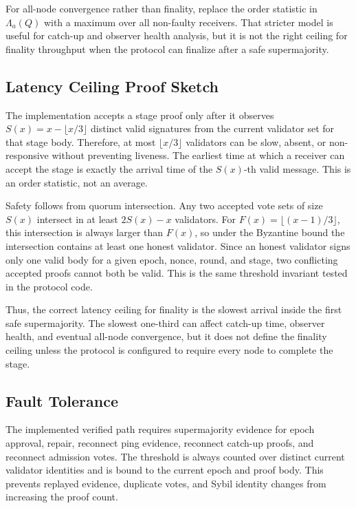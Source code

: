 For all-node convergence rather than finality, replace the order statistic in
\(\Lambda_a(Q)\) with a maximum over all non-faulty receivers. That stricter
model is useful for catch-up and observer health analysis, but it is not the
right ceiling for finality throughput when the protocol can finalize after a
safe supermajority.

\subsection{Latency Ceiling Proof Sketch}\label{proj:latency-proof}

The implementation accepts a stage proof only after it observes
\(S(x)=x-\lfloor x/3 \rfloor\) distinct valid signatures from the current
validator set for that stage body. Therefore, at most
\(\lfloor x/3 \rfloor\) validators can be slow, absent, or non-responsive
without preventing liveness. The earliest time at which a receiver can accept
the stage is exactly the arrival time of the \(S(x)\)-th valid message. This
is an order statistic, not an average.

Safety follows from quorum intersection. Any two accepted vote sets of size
\(S(x)\) intersect in at least \(2S(x)-x\) validators. For
\(F(x)=\lfloor (x-1)/3 \rfloor\), this intersection is always larger than
\(F(x)\), so under the Byzantine bound the intersection contains at least one
honest validator. Since an honest validator signs only one valid body for a
given epoch, nonce, round, and stage, two conflicting accepted proofs cannot
both be valid. This is the same threshold invariant tested in the protocol
code.

Thus, the correct latency ceiling for finality is the slowest arrival inside
the first safe supermajority. The slowest one-third can affect catch-up time,
observer health, and eventual all-node convergence, but it does not define
the finality ceiling unless the protocol is configured to require every node
to complete the stage.

\subsection{Fault Tolerance}\label{proj:ft}

The implemented verified path requires supermajority evidence for epoch
approval, repair, reconnect ping evidence, reconnect catch-up proofs, and
reconnect admission votes. The threshold is always counted over distinct
current validator identities and is bound to the current epoch and proof body.
This prevents replayed evidence, duplicate votes, and Sybil identity changes
from increasing the proof count.

